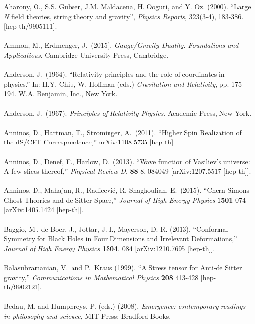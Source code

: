\documentclass[12pt]{article}
\renewcommand{\^}[1]{\hat{#1}}
\begin{document}
Aharony, O.,  S.S. Gubser, J.M. Maldacena, H. Ooguri, and Y. Oz. (2000). ``Large \emph{N} field theories, string theory and gravity'',  \emph{Physics Reports}, 323(3-4), 183-386.  [hep-th/9905111].\\
\\
Ammon, M., Erdmenger, J.~(2015). {\it Gauge/Gravity Duality. Foundations and Applications}. Cambridge University Press, Cambridge.\\
\\
Anderson, J.~(1964). ``Relativity principles and the role of coordinates in physics.'' In: H.Y. Chiu, W. Hoffman (eds.) {\it Gravitation and Relativity}, pp. 175-194. W.A. Benjamin, Inc., New York.\\
\\
Anderson, J.~(1967). {\it Principles of Relativity Physics}. Academic Press, New York.\\
\\
Anninos, D., Hartman, T., Strominger, A.~(2011). ``Higher Spin Realization of the dS/CFT Correspondence,''
  arXiv:1108.5735 [hep-th].\\
\\
Anninos, D., Denef, F., Harlow, D.~(2013). ``Wave function of Vasiliev’s universe: A few slices thereof,''
{\it Physical Review D}, {\bf 88} 8,  084049
  [arXiv:1207.5517 [hep-th]].\\
\\
Anninos, D., Mahajan, R., Radicevi\'c, R, Shaghoulian, E.~(2015). ``Chern-Simons-Ghost Theories and de Sitter Space,''
  {\it Journal of High Energy Physics} {\bf 1501} 074
  [arXiv:1405.1424 [hep-th]].\\
\\
Baggio, M., de Boer, J., Jottar, J. I., Mayerson, D. R. (2013). ``Conformal Symmetry for Black Holes in Four Dimensions and Irrelevant Deformations,''
  {\it Journal of High Energy Physics} {\bf 1304}, 084 
  [arXiv:1210.7695 [hep-th]].\\
\\
Balasubramanian, V.~and P.~Kraus (1999). ``A Stress tensor for Anti-de Sitter gravity,''
  {\it Communications in Mathematical Physics} {\bf 208} 413-428 
  [hep-th/9902121].\\
\\
Bedau, M. and Humphreys, P. (eds.) (2008), {\it Emergence: contemporary readings in 
philosophy and science}, MIT Press: Bradford Books. \\
\end{document}

